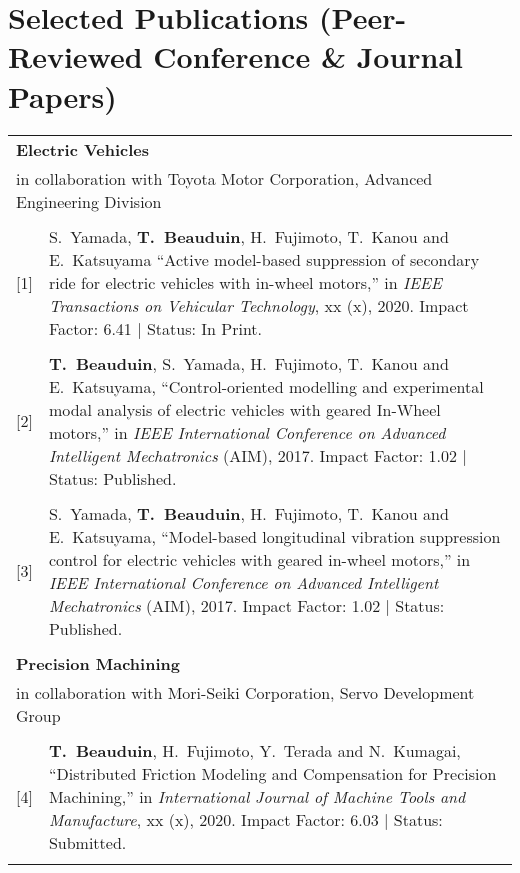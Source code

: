 \documentclass[a4paper,10pt]{article}
\begin{document}
\newpage
\section{Selected Publications (Peer-Reviewed Conference \& Journal Papers)}
\begin{tabularx}{\textwidth}{cX}

\multicolumn{2}{l}{\textbf{Electric Vehicles}} \\
\multicolumn{2}{l}{in collaboration with Toyota Motor Corporation, Advanced Engineering Division} \\
& \\
	
[1] & S.~Yamada, \textbf{T.~Beauduin}, H.~Fujimoto, T.~Kanou and E.~Katsuyama ``{Active model-based 
	suppression of secondary ride for electric vehicles with in-wheel motors},''
	in \emph{IEEE Transactions on Vehicular Technology}, xx (x), 2020. 
	Impact Factor: 6.41 | Status: In Print. \\
	& \\
	
[2] & \textbf{T.~Beauduin}, S.~Yamada, H.~Fujimoto, T.~Kanou and E.~Katsuyama, ``{Control-oriented modelling 
	and experimental modal analysis of electric vehicles with geared In-Wheel motors},'' in \emph{IEEE 
	International Conference on Advanced Intelligent Mechatronics} (AIM), 2017.
	Impact Factor: 1.02 | Status: Published. \\
& \\
	
[3] & S.~Yamada, \textbf{T.~Beauduin}, H.~Fujimoto, T.~Kanou and E.~Katsuyama, ``{Model-based 
	longitudinal vibration suppression control for electric vehicles with geared in-wheel motors},'' 
	in \emph{IEEE International Conference on Advanced Intelligent Mechatronics} (AIM), 2017.
	Impact Factor: 1.02 | Status: Published. \\
& \\

\multicolumn{2}{l}{\textbf{Precision Machining}} \\
\multicolumn{2}{l}{in collaboration with Mori-Seiki Corporation, Servo Development Group} \\
& \\

[4] & \textbf{T.~Beauduin}, H.~Fujimoto, Y.~Terada and N.~Kumagai, ``{Distributed Friction Modeling and 
	Compensation for Precision Machining},'' in \emph{International Journal of Machine Tools and 
	Manufacture}, xx (x), 2020.
	Impact Factor: 6.03 | Status: Submitted. \\
& \\


\end{tabularx}
\end{document}
